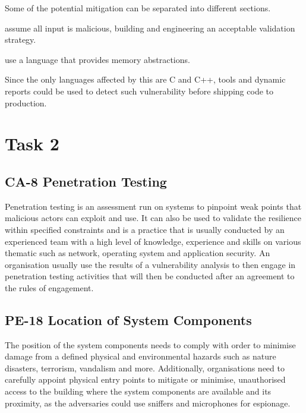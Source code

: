 Some of the potential mitigation can be separated into different sections.

\begin{description}[align=left]
  \item [Implementation] assume all input is malicious, building and
  engineering an acceptable validation strategy.
  \item [Architecture] use a language that provides memory abstractions.
\end{description}

Since the only languages affected by this are C and C++, tools and dynamic
reports could be used to detect such vulnerability before shipping code to
production.

\section{Task 2}
\label{lab4-task2}

\subsection{CA-8 Penetration Testing}
\label{lab4-sub-1}

Penetration testing is an assessment run on systems to pinpoint weak points that
malicious actors can exploit and use. It can also be used to validate the
resilience within specified constraints and is a practice that is usually
conducted by an experienced team with a high level of knowledge, experience and
skills on various thematic such as network, operating system and application
security. An organisation usually use the results of a vulnerability analysis to
then engage in penetration testing activities that will then be conducted after
an agreement to the rules of engagement.

\subsection{PE-18 Location of System Components}
\label{lab4-sub-2}
The position of the system components needs to comply with order to minimise
damage from a defined physical and environmental hazards such as nature
disasters, terrorism, vandalism and more. Additionally, organisations need to
carefully appoint physical entry points to mitigate or minimise, unauthorised
access to the building where the system components are available and its
proximity, as the adversaries could use sniffers and microphones for espionage.

